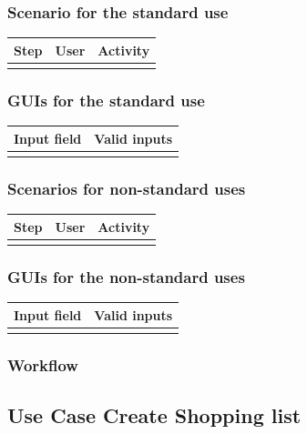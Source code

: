 \documentclass[12pt]{article}
\theoremstyle{definition}
\begin{document}
\subsubsection{Scenario for the standard use}

\begin{tabular}{|l|l|l|}
\hline
Step & User & Activity \\ \hline
 & & \\ \hline
\end{tabular}

\subsubsection{GUIs for the standard use}

\begin{tabular}{|l|l|}
\hline
Input field & Valid inputs \\ \hline
 &  \\ \hline
\end{tabular}

\subsubsection{Scenarios for non-standard uses}

\begin{tabular}{|l|l|l|}
\hline
Step & User & Activity \\ \hline
 & & \\ \hline
\end{tabular}

\subsubsection{GUIs for the non-standard uses}

\begin{tabular}{|l|l|}
\hline
Input field & Valid inputs \\ \hline
 &  \\ \hline
\end{tabular}

\subsubsection{Workflow}

\subsection{Use Case Create Shopping list}
\end{document}
